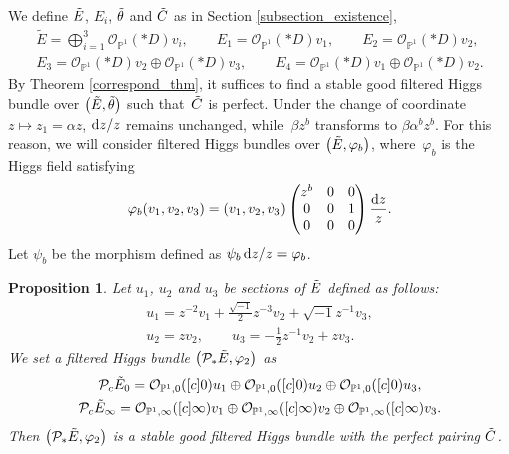 \documentclass[10pt,a4paper]{amsart}
\numberwithin{equation}{section}
\newtheorem{Proposition}[Theorem]{Proposition}
 { \theoremstyle{definition}
\newtheorem{Definition}[Theorem]{Definition}
\newtheorem{Note}[Theorem]{Note}
\newtheorem{Example}[Theorem]{Example}
\newtheorem{Remark}[Theorem]{Remark}

\newtheorem{Question}[Theorem]{Question}
\newtheorem{Assumption}[Theorem]{Assumption}}
\newcommand{\ps}{\mathbb{P}}
\newcommand{\strsheaf}{\mathcal{O}}
\begin{document}
We define $\Tilde{E}$, $E_i$, $\Tilde{\theta}$ and $\Tilde{C}$ as in Section \ref{subsection_existence},
\begin{gather*}
 \tilde{E} = \bigoplus_{i=1}^3 \strsheaf_{\ps^1}(*D)v_i,\qquad E_1 = \strsheaf_{\ps^1}(*D)v_1,\qquad E_2 = \strsheaf_{\ps^1}(*D)v_2, \\
 E_3 = \strsheaf_{\ps^1}(*D)v_2\oplus \strsheaf_{\ps^1}(*D)v_3,\qquad E_4 = \strsheaf_{\ps^1}(*D)v_1\oplus \strsheaf_{\ps^1}(*D)v_2.
\end{gather*}
By Theorem \ref{correspond_thm}, it suffices to find a stable good filtered Higgs bundle over $\bigl(\Tilde{E},\Tilde{\theta}\bigr)$ such that~$\Tilde{C}$ is perfect. Under the change of coordinate $z\mapsto z_1=\alpha z$, ${\rm d}z/z$ remains unchanged, while~$\beta z^b$ transforms to $\beta \alpha^b z^b$. For this reason, we will consider filtered Higgs bundles over $\big(\Tilde{E},\varphi_b\big)$, where~$\varphi_b$ is the Higgs field satisfying
\begin{equation*}
 \varphi_b(v_1,v_2,v_3) = (v_1,v_2,v_3) \begin{pmatrix}
 z^b & 0 & 0\\
 0 & 0 & 1 \\
 0 & 0 & 0
 \end{pmatrix}\frac{{\rm d}z}{z}.
\end{equation*}
Let $\psi_b$ be the morphism defined as $\psi_b\,{\rm d}z/z=\varphi_b$.
\begin{Proposition}\label{prop_Cstar_b2}
 Let $u_1$, $u_2$ and $u_3$ be sections of $\Tilde{E}$ defined as follows:
 \begin{gather*}
 u_1 = z^{-2}v_1 + \frac{\sqrt{-1}}{2}z^{-3}v_2 + \sqrt{-1}z^{-1}v_3,\\
 u_2 = zv_2,\qquad u_3 = -\frac{1}{2} z^{-1}v_2 + zv_3.
 \end{gather*}
 We set a filtered Higgs bundle $\big(\mathcal{P}_{*}\Tilde{E},\varphi_2\big)$ as
 \begin{gather*}
 \mathcal{P}_c \Tilde{E}_{0} = \strsheaf_{\ps^1,0}([c]0)u_1\oplus \strsheaf_{\ps^1,0}([c]0)u_2\oplus \strsheaf_{\ps^1,0}([c]0)u_3,\\
 \mathcal{P}_c \Tilde{E}_{\infty} = \strsheaf_{\ps^1,\infty}([c]\infty)v_1\oplus \strsheaf_{\ps^1,\infty}([c]\infty)v_2\oplus \strsheaf_{\ps^1,\infty}([c]\infty)v_3.
 \end{gather*}
 Then $\big(\mathcal{P}_{*}\Tilde{E},\varphi_2\big)$ is a stable good filtered Higgs bundle with the perfect pairing $\Tilde{C}$.
\end{Proposition}
\end{document}
